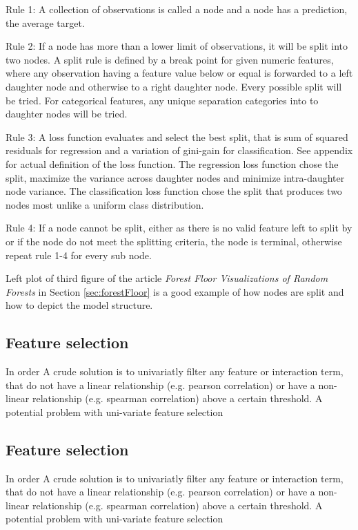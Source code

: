 Rule 1: A collection of observations is called a node and a node has a prediction, the average target.

Rule 2: If a node has more than a lower limit of observations, it will be split into two nodes. A split rule is defined by a break point for given numeric features, where any observation having a feature value below or equal is forwarded to a left daughter node and otherwise to a right daughter node. Every possible split will be tried. For categorical features, any unique separation categories into to daughter nodes will be tried.

Rule 3: A loss function evaluates and select the best split, that is sum of squared residuals for regression and a variation of gini-gain for classification. See appendix for actual definition of the loss function. The regression loss function chose the split, maximize the variance across daughter nodes and minimize intra-daughter node variance. The classification loss function chose the split that produces two nodes most unlike a uniform class distribution.

Rule 4: If a node cannot be split, either as there is no valid feature left to split by or if the node do not meet the splitting criteria, the node is terminal, otherwise repeat rule 1-4 for every sub node.

Left plot of third figure of the article \textit{Forest Floor Visualizations of Random Forests} in Section \ref{sec:forestFloor} is a good example of how nodes are split and how to depict the model structure.




\subsection{Feature selection}
In order 
A crude solution is to univariatly filter any feature or interaction term, that do not have a linear relationship (e.g. pearson correlation) or have a non-linear relationship (e.g. spearman correlation) above a certain threshold. A potential problem with uni-variate feature selection 




\subsection{Feature selection}
In order 
A crude solution is to univariatly filter any feature or interaction term, that do not have a linear relationship (e.g. pearson correlation) or have a non-linear relationship (e.g. spearman correlation) above a certain threshold. A potential problem with uni-variate feature selection 


